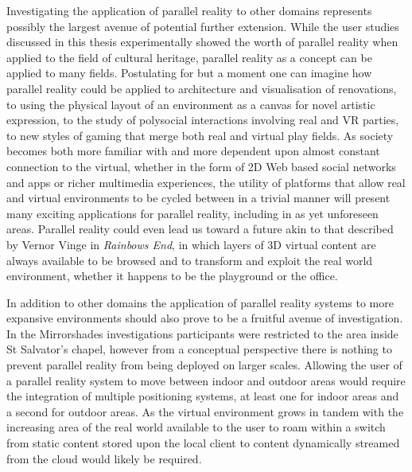 Investigating the application of parallel reality to other domains represents possibly the largest avenue of potential further extension. While the user studies discussed in this thesis experimentally showed the worth of parallel reality when applied to the field of cultural heritage, parallel reality as a concept can be applied to many fields. Postulating for but a moment one can imagine how parallel reality could be applied to architecture and visualisation of renovations, to using the physical layout of an environment as a canvas for novel artistic expression, to the study of polysocial interactions involving real and VR parties, to new styles of gaming that merge both real and virtual play fields. As society becomes both more familiar with and more dependent upon almost constant connection to the virtual, whether in the form of 2D Web based social networks and apps or richer multimedia experiences, the utility of platforms that allow real and virtual environments to be cycled between in a trivial manner will present many exciting applications for parallel reality, including in as yet unforeseen areas. Parallel reality could even lead us toward a future akin to that described by Vernor Vinge in \textit{Rainbows End}, in which layers of 3D virtual content are always available to be browsed and to transform and exploit the real world environment, whether it happens to be the playground or the office.

In addition to other domains the application of parallel reality systems to more expansive environments should also prove to be a fruitful avenue of investigation. In the Mirrorshades investigations participants were restricted to the area inside St Salvator's chapel, however from a conceptual perspective there is nothing to prevent parallel reality from being deployed on larger scales. Allowing the user of a parallel reality system to move between indoor and outdoor areas would require the integration of multiple positioning systems, at least one for indoor areas and a second for outdoor areas. As the virtual environment grows in tandem with the increasing area of the real world available to the user to roam within a switch from static content stored upon the local client to content dynamically streamed from the cloud would likely be required.

